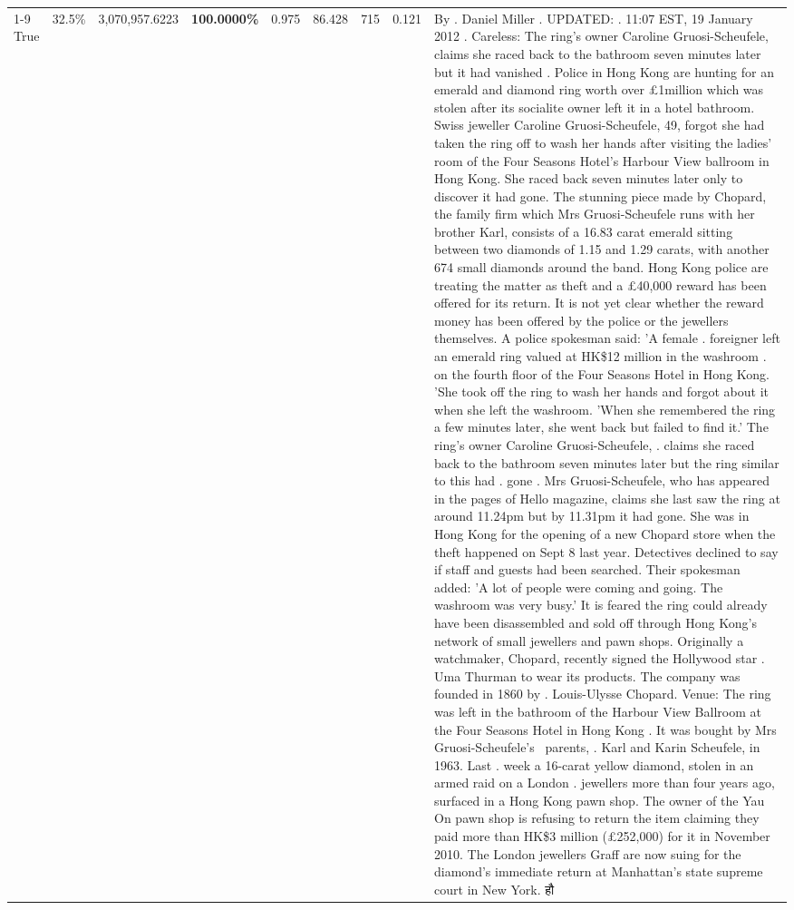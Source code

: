 \begin{table}[H]
\begin{tabular}{lllrlllll}
\cline{1-9} \cline{2-9}
True & 32.5\% & 3,070,957.6223 & \bfseries \color{red} 100.0000\% & 0.975 & 86.428 & 715 & 0.121 & By . Daniel Miller . UPDATED: . 11:07 EST, 19 January 2012 . Careless: The ring's owner Caroline Gruosi-Scheufele, claims she raced back to the bathroom seven minutes later but it had vanished . Police in Hong Kong are hunting for an emerald and diamond ring worth over £1million which was stolen after its socialite owner left it in a hotel bathroom. Swiss jeweller Caroline Gruosi-Scheufele, 49, forgot she had taken the ring off to wash her hands after visiting the ladies' room of the Four Seasons Hotel's Harbour View ballroom in Hong Kong. She raced back seven minutes later only to discover it had gone. The stunning piece made by Chopard, the family firm which Mrs Gruosi-Scheufele runs with her brother Karl, consists of a 16.83 carat emerald sitting between two diamonds of 1.15 and 1.29 carats, with another 674 small diamonds around the band. Hong Kong police are treating the matter as theft and a £40,000 reward has been offered for its return. It is not yet clear whether the reward money has been offered by the police or the jewellers themselves. A police spokesman said: 'A female . foreigner left an emerald ring valued at HK\$12 million in the washroom . on the fourth floor of the Four Seasons Hotel in Hong Kong. 'She took off the ring to wash her hands and forgot about it when she left the washroom. 'When she remembered the ring a few minutes later, she went back but failed to find it.' The ring's owner Caroline Gruosi-Scheufele, . claims she raced back to the bathroom seven minutes later but the ring similar to this had . gone . Mrs Gruosi-Scheufele, who has appeared in the pages of Hello magazine, claims she last saw the ring at around 11.24pm but by 11.31pm it had gone. She was in Hong Kong for the opening of a new Chopard store when the theft happened on Sept 8 last year. Detectives declined to say if staff and guests had been searched. Their spokesman added: 'A lot of people were coming and going. The washroom was very busy.' It is feared the ring could already have been disassembled and sold off through Hong Kong's network of small jewellers and pawn shops. Originally a watchmaker, Chopard, recently signed the Hollywood star . Uma Thurman to wear its products. The company was founded in 1860 by . Louis-Ulysse Chopard. Venue: The ring was left in the bathroom of the Harbour View Ballroom at the Four Seasons Hotel in Hong Kong . It was bought by Mrs Gruosi-Scheufele's  parents, . Karl and Karin Scheufele, in 1963. Last . week a 16-carat yellow diamond, stolen in an armed raid on a London . jewellers more than four years ago, surfaced in a Hong Kong pawn shop. The owner of the Yau On pawn shop is refusing to return the item claiming they paid more than HK\$3 million (£252,000) for it in November 2010. The London jewellers Graff are now suing for the diamond’s immediate return at Manhattan’s state supreme court in New York. हौ \\

\end{tabular}
\end{table}
